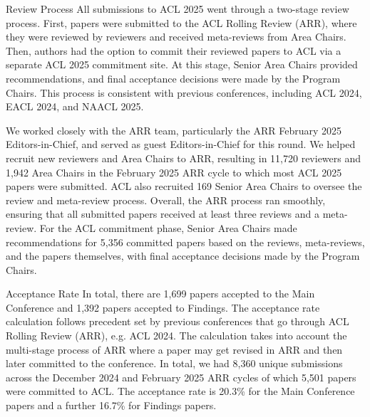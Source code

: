 Review Process
All submissions to ACL 2025 went through a two-stage review process. First, papers were submitted to the ACL Rolling Review (ARR), where they were reviewed by reviewers and received meta-reviews from Area Chairs. Then, authors had the option to commit their reviewed papers to ACL via a separate ACL 2025 commitment site. At this stage, Senior Area Chairs provided recommendations, and final acceptance decisions were made by the Program Chairs. This process is consistent with previous conferences, including ACL 2024, EACL 2024, and NAACL 2025.

We worked closely with the ARR team, particularly the ARR February 2025 Editors-in-Chief, and served as guest Editors-in-Chief for this round. We helped recruit new reviewers and Area Chairs to ARR, resulting in 11,720 reviewers and 1,942 Area Chairs in the February 2025 ARR cycle to which most ACL 2025 papers were submitted. ACL also recruited 169 Senior Area Chairs to oversee the review and meta-review process. Overall, the ARR process ran smoothly, ensuring that all submitted papers received at least three reviews and a meta-review. For the ACL commitment phase, Senior Area Chairs made recommendations for 5,356 committed papers based on the reviews, meta-reviews, and the papers themselves, with final acceptance decisions made by the Program Chairs.

Acceptance Rate
In total, there are 1,699 papers accepted to the Main Conference and 1,392 papers accepted to Findings. The acceptance rate calculation follows precedent set by previous conferences that go through ACL Rolling Review (ARR), e.g. ACL 2024. The calculation takes into account the multi-stage process of ARR where a paper may get revised in ARR and then later committed to the conference. In total, we had 8,360 unique submissions across the December 2024 and February 2025 ARR cycles of which 5,501 papers were committed to ACL. The acceptance rate is 20.3\% for the Main Conference papers and a further 16.7\% for Findings papers.

